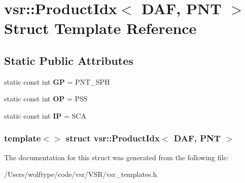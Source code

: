 \hypertarget{structvsr_1_1_product_idx_3_01_d_a_f_00_01_p_n_t_01_4}{\section{vsr\-:\-:Product\-Idx$<$ D\-A\-F, P\-N\-T $>$ Struct Template Reference}
\label{structvsr_1_1_product_idx_3_01_d_a_f_00_01_p_n_t_01_4}
}
\subsection*{Static Public Attributes}
\begin{DoxyCompactItemize}
\item 
\hypertarget{structvsr_1_1_product_idx_3_01_d_a_f_00_01_p_n_t_01_4_af534088e851ec24604b66cf7035ec49f}{static const int {\bfseries G\-P} = P\-N\-T\-\_\-\-S\-P\-H}\label{structvsr_1_1_product_idx_3_01_d_a_f_00_01_p_n_t_01_4_af534088e851ec24604b66cf7035ec49f}

\item 
\hypertarget{structvsr_1_1_product_idx_3_01_d_a_f_00_01_p_n_t_01_4_a16babb8900f7b86c6641fcf4d8193633}{static const int {\bfseries O\-P} = P\-S\-S}\label{structvsr_1_1_product_idx_3_01_d_a_f_00_01_p_n_t_01_4_a16babb8900f7b86c6641fcf4d8193633}

\item 
\hypertarget{structvsr_1_1_product_idx_3_01_d_a_f_00_01_p_n_t_01_4_afc6a65aff860eb67227620bbe45d5d9c}{static const int {\bfseries I\-P} = S\-C\-A}\label{structvsr_1_1_product_idx_3_01_d_a_f_00_01_p_n_t_01_4_afc6a65aff860eb67227620bbe45d5d9c}

\end{DoxyCompactItemize}
\subsubsection*{template$<$$>$ struct vsr\-::\-Product\-Idx$<$ D\-A\-F, P\-N\-T $>$}



The documentation for this struct was generated from the following file\-:\begin{DoxyCompactItemize}
\item 
/\-Users/wolftype/code/vsr/\-V\-S\-R/vsr\-\_\-templates.\-h\end{DoxyCompactItemize}
